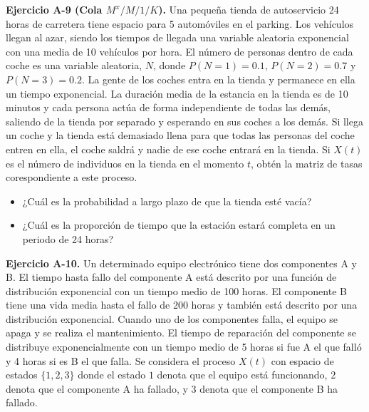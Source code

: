 \documentclass[
]{book}
\providecommand{\tightlist}{%
  \setlength{\itemsep}{0pt}\setlength{\parskip}{0pt}}
\theoremstyle{definition}
\theoremstyle{definition}
\theoremstyle{definition}
\theoremstyle{definition}
\theoremstyle{remark}
\begin{document}
\textbf{Ejercicio A-9 (Cola \(M^x/M/1/K\)).} Una pequeña tienda de autoservicio 24 horas de carretera tiene espacio para 5 automóviles en el parking. Los vehículos llegan al azar, siendo los tiempos de llegada una variable aleatoria exponencial con una media de 10 vehículos por hora. El número de personas dentro de cada coche es una variable aleatoria, \(N\), donde \(P(N = 1) = 0.1\), \(P(N = 2) = 0.7\) y \(P(N = 3) = 0.2\). La gente de los coches entra en la tienda y permanece en ella un tiempo exponencial. La duración media de la estancia en la tienda es de 10 minutos y cada persona actúa de forma independiente de todas las demás, saliendo de la tienda por separado y esperando en sus coches a los demás. Si llega un coche y la tienda está demasiado llena para que todas las personas del coche entren en ella, el coche saldrá y nadie de ese coche entrará en la tienda. Si \(X(t)\) es el número de individuos en la tienda en el momento \(t\), obtén la matriz de tasas corespondiente a este proceso.

\begin{itemize}
\tightlist
\item
  ¿Cuál es la probabilidad a largo plazo de que la tienda esté vacía?
\item
  ¿Cuál es la proporción de tiempo que la estación estará completa en un periodo de 24 horas?
\end{itemize}

\textbf{Ejercicio A-10.} Un determinado equipo electrónico tiene dos componentes A y B. El tiempo hasta fallo del componente A está descrito por una función de distribución exponencial con un tiempo medio de 100 horas. El componente B tiene una vida media hasta el fallo de 200 horas y también está descrito por una distribución exponencial. Cuando uno de los componentes falla, el equipo se apaga y se realiza el mantenimiento. El tiempo de reparación del componente se distribuye exponencialmente con un tiempo medio de 5 horas si fue A el que falló
y 4 horas si es B el que falla. Se considera el proceso \(X(t)\) con espacio de estados \(\{1, 2, 3\}\) donde el estado \(1\) denota que el equipo está funcionando, \(2\) denota que el componente A ha fallado, y \(3\) denota que el componente B ha fallado.
\end{document}
